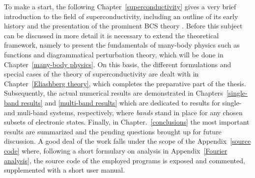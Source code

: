 To make a start, the following Chapter~\ref{superconductivity} gives a very
brief introduction to the field of superconductivity, including an outline of
its early history and the presentation of the prominent BCS theory \cites
{BardeenCooperSchrieffer57a} {BardeenCooperSchrieffer57b}. Before this subject
can be discussed in more detail it is necessary to extend the theoretical
framework, namely to present the fundamentals of many-body physics such as
 functions and diagrammatical perturbation theory, which will be
done in Chapter~\ref{many-body physics}. On this basis, the different
formulations and special cases of the  theory of
superconductivity are dealt with in Chapter~\ref{Eliashberg theory}, which
completes the preparative part of the thesis. Subsequently, the actual numerical
results are demonstrated in Chapters~\ref{single-band results} and
\ref{multi-band results} which are dedicated to results for single- and
muli-band systems, respectively, where \emph{bands} stand in place for any
chosen subsets of electronic states. Finally, in Chapter.~\ref{conclusions} the
most important results are summarized and the pending questions brought up for
future discussion. A good deal of the work falls under the scope of the
Appendix~\ref{source code} where, following a short formulary on 
analysis in Appendix~\ref{Fourier analysis}, the source code of the employed
programs is exposed and commented, supplemented with a short user manual.

